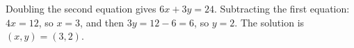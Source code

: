 Doubling the second equation gives $6x+3y=24$. Subtracting the first equation: $4x=12$, so $x=3$, and then $3y=12-6=6$, so $y=2$. The solution is $\boxed{(x,y)=(3,2)}$.
